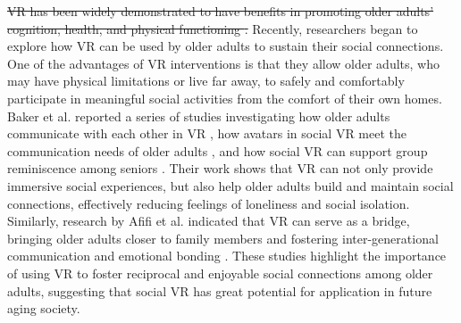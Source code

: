 
\sout{VR has been widely demonstrated to have benefits in promoting older adults' cognition, health, and physical functioning \cite{appel2020older,mirelman2016addition,roberts2019older,eisapour2018game,dickens2011interventions,du2024lightsword}.}
Recently, researchers began to explore how VR can be used by older adults to sustain their social connections.
One of the advantages of VR interventions is that they allow older adults, who may have physical limitations or live far away, to safely and comfortably participate in meaningful social activities from the comfort of their own homes. Baker et al. reported a series of studies investigating how older adults communicate with each other in VR \cite{baker2019interrogating}, how avatars in social VR meet the communication needs of older adults \cite{baker2021avatar}, and how social VR can support group reminiscence among seniors \cite{baker2021school,baker2019exploring}. Their work shows that VR can not only provide immersive social experiences, but also help older adults build and maintain social connections, effectively reducing feelings of loneliness and social isolation. Similarly, research by Afifi et al. indicated that VR can serve as a bridge, bringing older adults closer to family members \cite{afifi2023using} and fostering inter-generational communication and emotional bonding \cite{wei2023bridging}. These studies highlight the importance of using VR to foster reciprocal and enjoyable social connections among older adults, suggesting that social VR has great potential for application in future aging society.

